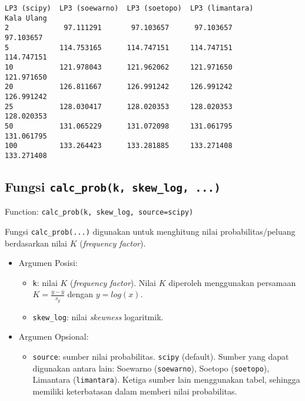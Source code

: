 \documentclass[11pt]{article}
\makeatletter
\providecommand{\tightlist}{%
      \setlength{\itemsep}{0pt}\setlength{\parskip}{0pt}}
\newcommand{\boxspacing}{\kern\kvtcb@left@rule\kern\kvtcb@boxsep}
\newcommand{\prompt}[4]{
        {\ttfamily\llap{{\color{#2}[#3]:\hspace{3pt}#4}}\vspace{-\baselineskip}}
    }
\makeatother
\begin{document}
            \begin{tcolorbox}[breakable, size=fbox, boxrule=.5pt, pad at break*=1mm, opacityfill=0]
\prompt{Out}{outcolor}{ }{\boxspacing}
\begin{Verbatim}[commandchars=\\\{\}]
            LP3 (scipy)  LP3 (soewarno)  LP3 (soetopo)  LP3 (limantara)
Kala Ulang
2             97.111291       97.103657      97.103657        97.103657
5            114.753165      114.747151     114.747151       114.747151
10           121.978043      121.962062     121.971650       121.971650
20           126.811667      126.991242     126.991242       126.991242
25           128.030417      128.020353     128.020353       128.020353
50           131.065229      131.072098     131.061795       131.061795
100          133.264423      133.281885     133.271408       133.271408
\end{Verbatim}
\end{tcolorbox}
        
    \hypertarget{fungsi-calc_probk-skew_log-...}{%
\subsection{\texorpdfstring{Fungsi
\texttt{calc\_prob(k,\ skew\_log,\ ...)}}{Fungsi calc\_prob(k, skew\_log, ...)}}\label{fungsi-calc_probk-skew_log-...}}

Function:
\texttt{calc\_prob(k,\ skew\_log,\ source=\textquotesingle{}scipy\textquotesingle{})}

Fungsi \texttt{calc\_prob(...)} digunakan untuk menghitung nilai
probabilitas/peluang berdasarkan nilai \(K\) (\emph{frequency factor}).

\begin{itemize}
\tightlist
\item
  Argumen Posisi:

  \begin{itemize}
  \tightlist
  \item
    \texttt{k}: nilai \(K\) (\emph{frequency factor}). Nilai \(K\)
    diperoleh menggunakan persamaan \(K = \frac{y-\bar{y}}{s_y}\) dengan
    \(y = log(x)\).
  \item
    \texttt{skew\_log}: nilai \emph{skewness} logaritmik.
  \end{itemize}
\item
  Argumen Opsional:

  \begin{itemize}
  \tightlist
  \item
    \texttt{source}: sumber nilai probabilitas.
    \texttt{\textquotesingle{}scipy\textquotesingle{}} (default). Sumber
    yang dapat digunakan antara lain: Soewarno
    (\texttt{\textquotesingle{}soewarno\textquotesingle{}}), Soetopo
    (\texttt{\textquotesingle{}soetopo\textquotesingle{}}), Limantara
    (\texttt{\textquotesingle{}limantara\textquotesingle{}}). Ketiga
    sumber lain menggunakan tabel, sehingga memiliki keterbatasan dalam
    memberi nilai probabilitas.
  \end{itemize}
\end{itemize}
\end{document}
